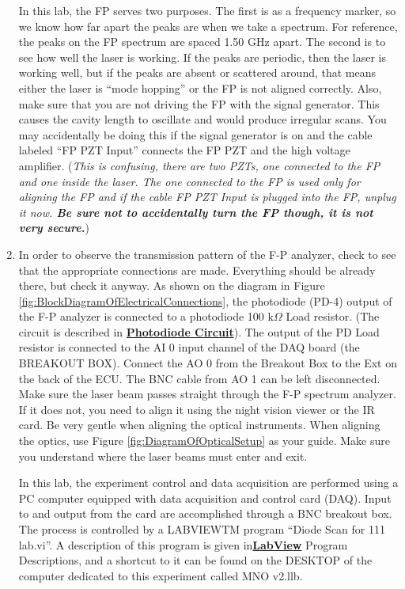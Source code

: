 \documentclass{../lab}
\begin{document}
\begin{enumerate}
    In this lab, the FP serves two purposes. The first is as a frequency marker, so we know how far apart the peaks are when we take a spectrum. For reference, the peaks on the FP spectrum are spaced 1.50 GHz apart. The second is to see how well the laser is working. If the peaks are periodic, then the laser is working well, but if the peaks are absent or scattered around, that means either the laser is ``mode hopping'' or the FP is not aligned correctly. Also, make sure that you are not driving the FP with the signal generator. This causes the cavity length to oscillate and would produce irregular scans. You may accidentally be doing this if the signal generator is on and the cable labeled ``FP PZT Input'' connects the FP PZT and the high voltage amplifier. (\emph{This is confusing, there are two PZTs, one connected to the FP and one inside the laser. The one connected to the FP is used only for aligning the FP and if the cable FP PZT Input is plugged into the FP, unplug it now. \textbf{ Be sure not to accidentally turn the FP though, it is not very secure.}})
    
    \item In order to observe the transmission pattern of the F-P analyzer, check to see that the appropriate connections are made. Everything should be already there, but check it anyway. As shown on the diagram in Figure \ref{fig:BlockDiagramOfElectricalConnections}, the photodiode (PD-4) output of the F-P analyzer is connected to a photodiode 100 k$ \Omega $ Load resistor. (The circuit is described in \href{http://experimentationlab.berkeley.edu/node/120}{\textbf{Photodiode Circuit}}). The output of the PD Load resistor is connected to the AI 0 input channel of the DAQ board (the BREAKOUT BOX). Connect the AO 0 from the Breakout Box to the Ext on the back of the ECU. The BNC cable from AO 1 can be left disconnected. Make sure the laser beam passes straight through the F-P spectrum analyzer. If it does not, you need to align it using the night vision viewer or the IR card. Be very gentle when aligning the optical instruments. When aligning the optics, use Figure \ref{fig:DiagramOfOpticalSetup} as your guide. Make sure you understand where the laser beams must enter and exit.
    
    In this lab, the experiment control and data acquisition are performed using a PC computer equipped with data acquisition and control card (DAQ). Input to and output from the card are accomplished through a BNC breakout box. The process is controlled by a LABVIEWTM program ``Diode Scan for 111 lab.vi''. A description of this program is given in\href{http://experimentationlab.berkeley.edu/node/119}{\textbf{}}\href{http://experimentationlab.berkeley.edu/node/119}{\textbf{LabView}} Program Descriptions, and a shortcut to it can be found on the DESKTOP of the computer dedicated to this experiment called MNO v2.llb.
    

\end{enumerate}
\end{document}
